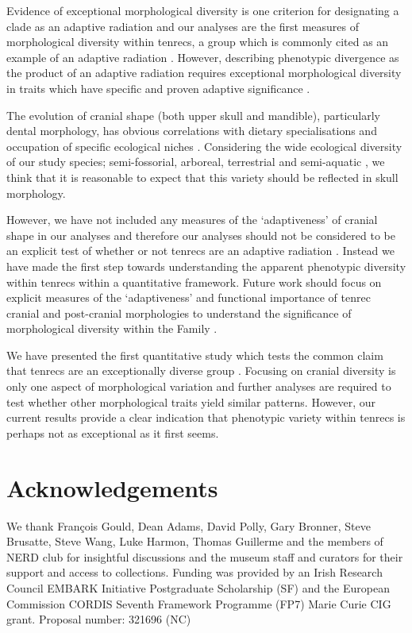 \documentclass[12pt,a4paper]{article}
\begin{document}
 	Evidence of exceptional morphological diversity is one criterion for designating a clade as an adaptive radiation \citep{Losos2010a} and our analyses are the first measures of morphological diversity within tenrecs, a group which is commonly cited as an example of an adaptive radiation \citep{Olson2013}.  However, describing phenotypic divergence as the product of an adaptive radiation requires exceptional morphological diversity in traits which have specific and proven adaptive significance \citep{Losos2010a}. 
 	
 	The evolution of cranial shape (both upper skull and mandible), particularly dental morphology, has obvious correlations with dietary specialisations and occupation of specific ecological niches \citep[e.g.][]{Wroe2007}. Considering the wide ecological diversity of our study species; semi-fossorial, arboreal, terrestrial and semi-aquatic \citep{Soarimalala2011}, we think that it is reasonable to expect that this variety should be reflected in skull morphology.
 	
 	However, we have not included any measures of the `adaptiveness' of cranial shape in our analyses and therefore our analyses should not be considered to be an explicit test of whether or not tenrecs are an adaptive radiation \citep{Losos2010a}. Instead we have made the first step towards understanding the apparent phenotypic diversity within tenrecs within a quantitative framework. Future work should focus on explicit measures of the `adaptiveness' and functional importance of tenrec cranial and post-cranial morphologies to understand the significance of morphological diversity within the Family \citep[e.g.][]{Mahler2010}.
 	
  

	
	We have presented the first quantitative study which tests the common claim that tenrecs are an exceptionally diverse group \citep{Olson2013, Soarimalala2011,Eisenberg1969}. Focusing on cranial diversity is only one aspect of morphological variation and further analyses are required to test whether other morphological traits yield similar patterns. However, our current results provide a clear indication that phenotypic variety within tenrecs is perhaps not as exceptional as it first seems.
	
\section{Acknowledgements}

	We thank Fran\c{c}ois Gould, Dean Adams, David Polly, Gary Bronner, Steve Brusatte, Steve Wang, Luke Harmon, Thomas Guillerme and the members of NERD club for insightful discussions and the museum 
	staff and curators for their support and access to collections. Funding was provided by an Irish Research Council EMBARK Initiative Postgraduate Scholarship (SF) and the European Commission CORDIS Seventh Framework Programme (FP7) Marie Curie CIG grant. Proposal number: 321696 (NC)
\end{document}
